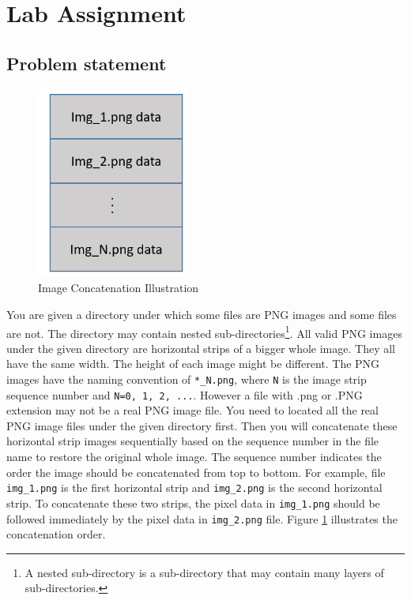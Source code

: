 \section{Lab Assignment}
\subsection{Problem statement}

\begin{figure}
  \includegraphics[width=2in]{img/img_concatenation}
  \caption{Image Concatenation Illustration}
\label{fig_img_concatenation}
\end{figure}

You are given a directory under which some files are PNG images and some files are not. The directory may contain nested sub-directories\footnote{A nested sub-directory is a sub-directory that may contain many layers of sub-directories.}. All valid PNG images under the given directory are horizontal strips of a bigger whole image. They all have the same width. The height of each image might be different. The PNG images have the naming convention of \verb+*_N.png+, where \verb+N+ is the image strip sequence number and \verb+N=0, 1, 2, ...+. However a file with .png or .PNG extension may not be a real PNG image file. You need to located all the real PNG image files under the given directory first. Then you will concatenate these horizontal strip images sequentially based on the sequence number in the file name to restore the original whole image. The sequence number indicates the order the image should be concatenated from top to bottom. For example, file \verb+img_1.png+ is the first horizontal strip and \verb+img_2.png+ is the second horizontal strip. To concatenate these two strips, the pixel data in \verb+img_1.png+ should be followed immediately by the pixel data in \verb+img_2.png+ file. Figure \ref{fig_img_concatenation} illustrates the concatenation order.

